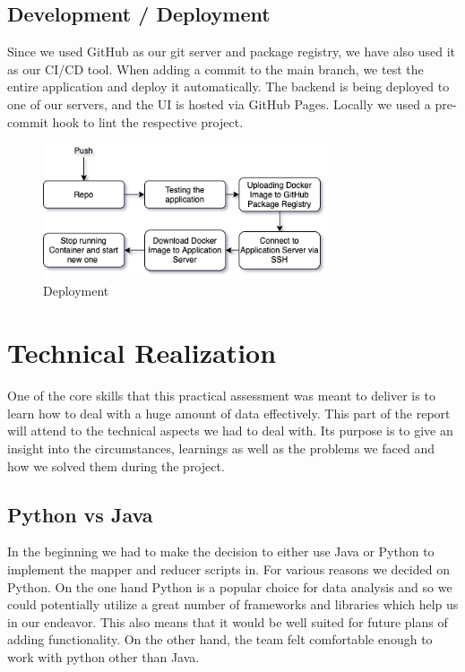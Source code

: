 \documentclass[
    fontsize=12pt,
    headings=small,
    parskip=half,           %
    bibliography=totoc,
    numbers=noenddot,       %
    open=any,               %
    ]{scrreprt}
\begin{document}
\newpage

\subsection{Development / Deployment}
Since we used GitHub as our git server and package registry, we have also used it as our CI/CD tool. When adding a commit to the main branch, we test the entire application and deploy it automatically. The backend is being deployed to one of our servers, and the UI is hosted via GitHub Pages. Locally we used a pre-commit hook to lint the respective project. 

\begin{figure}[h]
    \centering
    \includegraphics[width=0.75\textwidth]{Deployment.png}
    \caption{Deployment}
\end{figure}

\section{Technical Realization}
One of the core skills that this practical assessment was meant to deliver is to learn how to deal with a huge amount of data effectively. This part of the report will attend to the technical aspects we had to deal with. Its purpose is to give an insight into the circumstances, learnings as well as the problems we faced and how we solved them during the project. 


\subsection*{Python vs Java}
In the beginning we had to make the decision to either use Java or Python to implement the mapper and reducer scripts in. For various reasons we decided on Python. On the one hand Python is a popular choice for data analysis and so we could potentially utilize a great number of frameworks and libraries which help us in our endeavor. This also means that it would be well suited for future plans of adding functionality. On the other hand, the team felt comfortable enough to work with python other than Java. 
\end{document}
